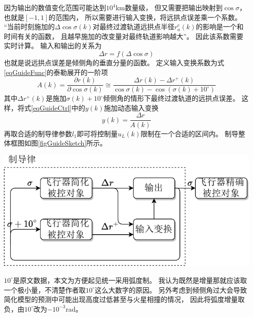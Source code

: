 因为输出的数值变化范围可能达到$10^4$km数量级，
但又需要把输出映射到$\cos\sigma$，也就是$[-1,1]$的范围内，
所以需要进行输入变换，将远拱点误差乘一个系数。
“当前时刻施加的$\Delta\cos\sigma(k)$对最终过渡轨道远拱点半径$r_a^e(k)$的影响是一个和时间有关的函数，
且越早施加的改变量对最终轨道影响越大”\cite{dqingyuan2019}。
因此该系数需要实时计算。
输入和输出的关系为
\begin{equation}
    \Delta r = f(\Delta\cos\sigma) \label{eqGuideFunc}
\end{equation}
也就是说远拱点误差是倾侧角的垂直分量的函数。
定义输入变换系数为式\eqref{eqGuideFunc}的泰勒展开的一阶项
\begin{equation*}
    A(k) = \frac{\partial r(k)}{\partial\cos\sigma(k)}
    \cong \frac{\Delta r(k) - \Delta r^+(k)}{\cos\sigma(k) - \cos(\sigma(k)+10^\circ)}
\end{equation*}
其中$\Delta r^+(k)$是施加$\sigma(k)+10^\circ$倾侧角的情形下最终过渡轨道的远拱点误差。
这样，将式\eqref{eqGuideCtrl}中的$y(k)$施加动态输入变换
\[y(k) = \frac{\Delta r}{A(k)}\]
再取合适的制导律参数$l_1$即可将控制量$u_L(k)$限制在一个合适的区间内。
制导整体框图如图\ref{figGuideSketch}所示。
\begin{center}
	\includegraphics[scale=0.7]{GuideSketch.pdf}  \\
	\label{figGuideSketch}
\end{center}

$10^\circ$是原文数据，本文为方便起见统一采用弧度制。
我认为既然是增量那就应该取一个极小量，不清楚作者取$10^\circ$这么大数字的原因。
另外考虑到倾侧角过大会导致简化模型的预测中可能出现高度过低甚至与火星相撞的情况，
因此将弧度增量取负，由$10^\circ$改为$-10^{-3}$rad。

